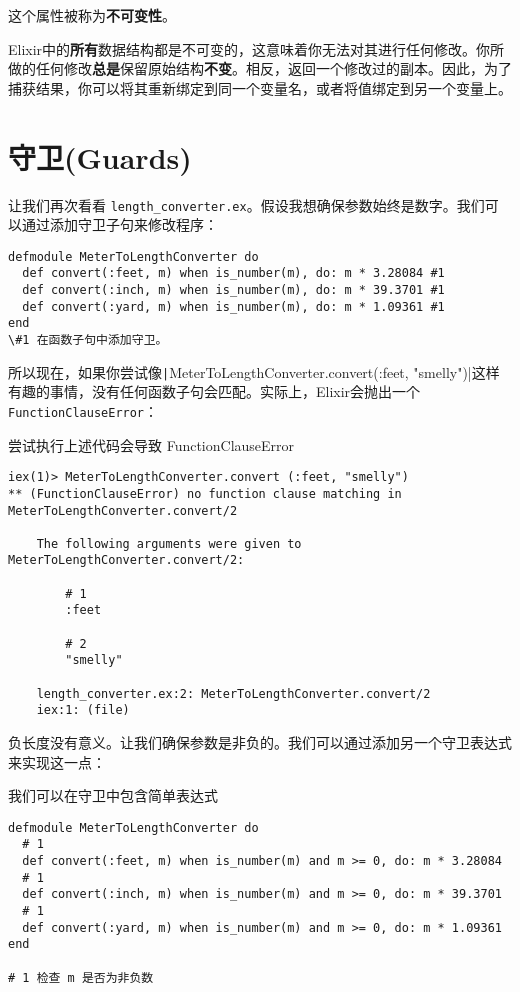 这个属性被称为\textbf{不可变性}。

Elixir中的\textbf{所有}数据结构都是不可变的，这意味着你无法对其进行任何修改。你所做的任何修改\textbf{总是}保留原始结构\textbf{不变}。相反，返回一个修改过的副本。因此，为了捕获结果，你可以将其重新绑定到同一个变量名，或者将值绑定到另一个变量上。

\section{守卫(Guards)}

让我们再次看看
\texttt{length\_converter.ex}。假设我想确保参数始终是数字。我们可以通过添加守卫子句来修改程序：

\begin{code}{}\begin{verbatim}
defmodule MeterToLengthConverter do
  def convert(:feet, m) when is_number(m), do: m * 3.28084 #1
  def convert(:inch, m) when is_number(m), do: m * 39.3701 #1
  def convert(:yard, m) when is_number(m), do: m * 1.09361 #1
end
\#1 在函数子句中添加守卫。
\end{verbatim}
\end{code}


所以现在，如果你尝试像\texttt|{MeterToLengthConverter.convert(:feet, "smelly")}|这样有趣的事情，没有任何函数子句会匹配。实际上，Elixir会抛出一个\texttt{FunctionClauseError}：

\begin{code}{尝试执行上述代码会导致 FunctionClauseError}
\begin{verbatim}
iex(1)> MeterToLengthConverter.convert (:feet, "smelly")
** (FunctionClauseError) no function clause matching in MeterToLengthConverter.convert/2

    The following arguments were given to MeterToLengthConverter.convert/2:

        # 1
        :feet

        # 2
        "smelly"

    length_converter.ex:2: MeterToLengthConverter.convert/2
    iex:1: (file)
\end{verbatim}
\label{lst:trying_to_execute_the_above_code_will_result_in_a_functionclauseerror}
\end{code}

负长度没有意义。让我们确保参数是非负的。我们可以通过添加另一个守卫表达式来实现这一点：

\begin{code}{我们可以在守卫中包含简单表达式}
\begin{verbatim}
defmodule MeterToLengthConverter do
  # 1
  def convert(:feet, m) when is_number(m) and m >= 0, do: m * 3.28084
  # 1
  def convert(:inch, m) when is_number(m) and m >= 0, do: m * 39.3701
  # 1
  def convert(:yard, m) when is_number(m) and m >= 0, do: m * 1.09361
end

# 1 检查 m 是否为非负数
\end{verbatim}
\label{lst:we_can_include_simple_expressions_in_guards}
\end{code}


